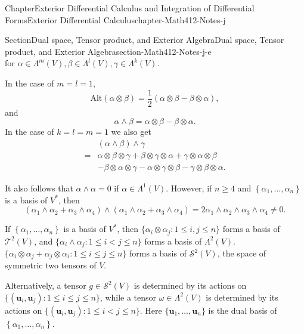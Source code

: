 \documentclass[oneside,10pt,]{book}
\numberwithin{equation}{section}
\newcommand{\bu}{\mathbf{u}}
\newcommand{\amp}{&}
\begin{document}
\begin{chapterptx}{Chapter}{Exterior Differential Calculus and Integration of Differential Forms}{}{Exterior Differential Calculus}{}{}{chapter-Math412-Notes-j}
\begin{sectionptx}{Section}{Dual space, Tensor product, and Exterior Algebra}{}{Dual space, Tensor product, and Exterior Algebra}{}{}{section-Math412-Notes-j-e}
\begin{equation}
\end{equation}
for \(\alpha \in \Lambda^{m}(V), \beta\in \Lambda^{l}(V), \gamma\in \Lambda^{k}(V)\).%
\par
In the case of \(m=l=1\),%
\begin{equation*}
\text{Alt}(\alpha \otimes \beta)=\frac 12 \left( \alpha \otimes \beta-\beta \otimes \alpha \right),
\end{equation*}
and%
\begin{equation*}
\alpha \wedge \beta=\alpha \otimes \beta-\beta \otimes \alpha.
\end{equation*}
In the case of \(k=l=m=1\) we also get%
\begin{align*}
\amp \left(\alpha \wedge \beta \right)\wedge \gamma\\
= \amp \alpha\otimes \beta \otimes \gamma
+  \beta \otimes \gamma \otimes \alpha+   \gamma \otimes \alpha\otimes \beta\\
\amp
-  \beta \otimes \alpha\otimes \gamma - \alpha \otimes \gamma \otimes \beta
- \gamma \otimes \beta \otimes \alpha.
\end{align*}
%
\par
It also follows that \(\alpha \wedge \alpha =0\) if \(\alpha \in \Lambda^{1}(V)\). However, if \(n\ge 4\) and \(\left\{\alpha_{1},\ldots, \alpha_{n}\right\}\) is a basis of \(V^{*}\), then%
\begin{equation*}
(\alpha_{1} \wedge \alpha_{2}+\alpha_{3} \wedge \alpha_{4})\wedge
(\alpha_{1} \wedge \alpha_{2}+\alpha_{3} \wedge \alpha_{4})
=2 \alpha_{1} \wedge \alpha_{2}\wedge \alpha_{3} \wedge \alpha_{4}\ne 0.
\end{equation*}
%
\par
If \(\left\{\alpha_{1},\ldots, \alpha_{n}\right\}\) is a basis of \(V^{*}\), then \(\{\alpha_{i}\otimes \alpha_{j}: 1\le i, j\le n\}\) forms a basis of \({\mathcal T}^{2}(V)\), and \(\{\alpha_{i}\wedge \alpha_{j}: 1\le i < j\le n\}\) forms a basis of \(\Lambda^{2}(V)\). \(\{\alpha_{i}\otimes \alpha_{j} + \alpha_{j}\otimes \alpha_{i}: 1\le i\le j\le n\}\) forms a basis of \({\mathcal S}^{2}(V)\), the space of symmetric two tensors of \(V\).%
\par
Alternatively, a tensor \(g\in {\mathcal S}^{2}(V)\) is determined by its actions on \(\{(\bu_{i}, \bu_{j}): 1\le i\le j\le n\}\), while a tensor \(\omega\in \Lambda^{2}(V)\) is determined by its actions on \(\{(\bu_{i}, \bu_{j}): 1\le i < j\le n\}\). Here \(\{\bu_{1}, \ldots, \bu_{n}\}\) is the dual basis of \(\left\{\alpha_{1},\ldots, \alpha_{n}\right\}\).%
\par

\end{sectionptx}
\end{chapterptx}
\end{document}
